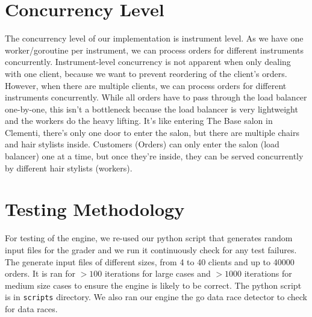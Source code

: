 \documentclass[11pt]{article}
\begin{document}
\section{Concurrency Level}

The concurrency level of our implementation is instrument level. As we have one worker/goroutine per instrument, we can process orders for different instruments concurrently. Instrument-level concurrency is not apparent when only dealing with one client, because we want to prevent reordering of the client's orders. However, when there are multiple clients, we can process orders for different instruments concurrently.
While all orders have to pass through the load balancer one-by-one, this isn't a bottleneck because the load balancer is very lightweight and the workers do the heavy lifting. It's like entering The Base salon in Clementi, there's only one door to enter the salon, but there are multiple chairs and hair stylists inside. Customers (Orders) can only enter the salon (load balancer) one at a time, but once they're inside, they can be served concurrently by different hair stylists (workers).


\section{Testing Methodology}

For testing of the engine, we re-used our python script that generates random input files for the grader and we run it
continuously check for any test failures. The generate input files of different sizes, from 4 to 40
clients and up to 40000 orders. It is ran for $> 100$ iterations for large cases and $> 1000$
iterations for medium size cases to ensure the engine is likely to be correct.
The python script is in \texttt{scripts} directory. We
also ran our engine the go data race detector to check for data races.

\end{document}
